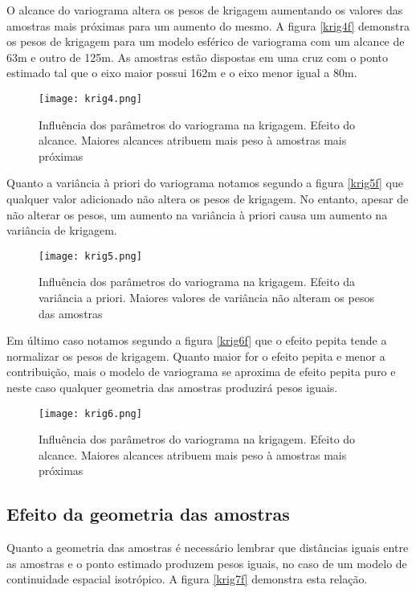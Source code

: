 O alcance do variograma altera os pesos de krigagem aumentando os valores das amostras mais próximas para um aumento do mesmo. A figura \eqref{krig4f} demonstra os pesos de krigagem para um modelo esférico de variograma com um alcance de 63m e outro de 125m. As amostras estão dispostas em uma cruz com o ponto estimado tal que o eixo maior possui 162m e o eixo menor igual a 80m. 

\begin{figure}[H]
   	\centering
   	\texttt{[image: krig4.png]}
   	\caption{Influência dos parâmetros do variograma na krigagem. Efeito do alcance. Maiores alcances atribuem mais peso à amostras mais próximas}
   	\label{krig4f}
\end{figure}

Quanto a variância à priori do variograma notamos segundo a figura \eqref{krig5f} que qualquer valor adicionado não altera os pesos de krigagem. No entanto, apesar de não alterar os pesos, um aumento na variância à priori causa um aumento na variância de krigagem. 

\begin{figure}[H]
  	\centering
  	\texttt{[image: krig5.png]}
  	\caption{Influência dos parâmetros do variograma na krigagem. Efeito da variância a priori. Maiores valores de variância não alteram os pesos das amostras}
  	\label{krig5f}
\end{figure}

Em último caso notamos segundo a figura \eqref{krig6f} que o efeito pepita tende a normalizar os pesos de krigagem. Quanto maior for o efeito pepita e menor a contribuição, mais o modelo de variograma se aproxima de efeito pepita puro e neste caso qualquer geometria das amostras produzirá pesos iguais. 

\begin{figure}[H]
	\centering
	\texttt{[image: krig6.png]}
	\caption{Influência dos parâmetros do variograma na krigagem. Efeito do alcance. Maiores alcances atribuem mais peso à amostras mais próximas}
	\label{krig6f}
\end{figure}

\subsection{Efeito da geometria das amostras}

Quanto a geometria das amostras é necessário lembrar que distâncias iguais entre as amostras e o ponto estimado produzem pesos iguais, no caso de um modelo de continuidade espacial isotrópico. A figura \eqref{krig7f} demonstra esta relação.

